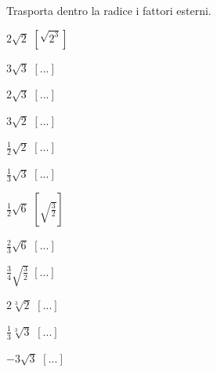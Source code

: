 
\begin{esercizio}[*]
\label{ese:2.40}
Trasporta dentro la radice i fattori esterni.
\begin{htmulticols}{4}
\begin{enumeratea}
\item \(2\sqrt 2\)
\hfill \(\left[\sqrt{2^3}\right]\)
\item \(3\sqrt 3\)
\hfill \(\left[...\right]\)
\item \(2\sqrt 3\)
\hfill \(\left[...\right]\)
\item \(3\sqrt 2\)
\hfill \(\left[...\right]\)
\item \(\frac 1 2\sqrt 2\)
\hfill \(\left[...\right]\)
\item \(\frac 1 3\sqrt 3\)
\hfill \(\left[...\right]\)
\item \(\frac 1 2\sqrt 6\)
\hfill \(\left[\sqrt{\frac 3 2}\right]\)
\item \(\frac 2 3\sqrt 6\)
\hfill \(\left[...\right]\)
 \item \(\frac 3 4\sqrt{\frac 3 2}\)
  \hfill \(\left[...\right]\)
\item \(2\sqrt[3]2\)
\hfill \(\left[...\right]\)
\item \(\frac 1 3\sqrt[3]3\)
\hfill \(\left[...\right]\)
\item \(-3\sqrt 3\)
\hfill \(\left[...\right]\)
\end{enumeratea}
\end{htmulticols}
\end{esercizio}

